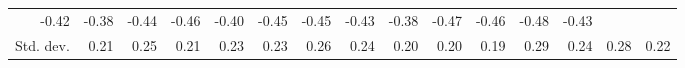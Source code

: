 \begin{tabular}{lllllllllllllll}
  \multicolumn{1}{r}{-0.42} &
  \multicolumn{1}{r}{-0.38} &
  \multicolumn{1}{r}{-0.44} &
  \multicolumn{1}{r}{-0.46} &
  \multicolumn{1}{r}{-0.40} &
  \multicolumn{1}{r}{-0.45} &
  \multicolumn{1}{r}{-0.45} &
  \multicolumn{1}{r}{-0.43} &
  \multicolumn{1}{r}{-0.38} &
  \multicolumn{1}{r}{-0.47} &
  \multicolumn{1}{r}{-0.46} &
  \multicolumn{1}{r}{-0.48} &
  \multicolumn{1}{r}{-0.43} \\
\multicolumn{1}{l}{\hspace{2em}Std. dev.} &
  \multicolumn{1}{|r}{0.21} &
  \multicolumn{1}{r}{0.25} &
  \multicolumn{1}{r}{0.21} &
  \multicolumn{1}{r}{0.23} &
  \multicolumn{1}{r}{0.23} &
  \multicolumn{1}{r}{0.26} &
  \multicolumn{1}{r}{0.24} &
  \multicolumn{1}{r}{0.20} &
  \multicolumn{1}{r}{0.20} &
  \multicolumn{1}{r}{0.19} &
  \multicolumn{1}{r}{0.29} &
  \multicolumn{1}{r}{0.24} &
  \multicolumn{1}{r}{0.28} &
  \multicolumn{1}{r}{0.22} \\
\cline{1-15}
\end{tabular}
